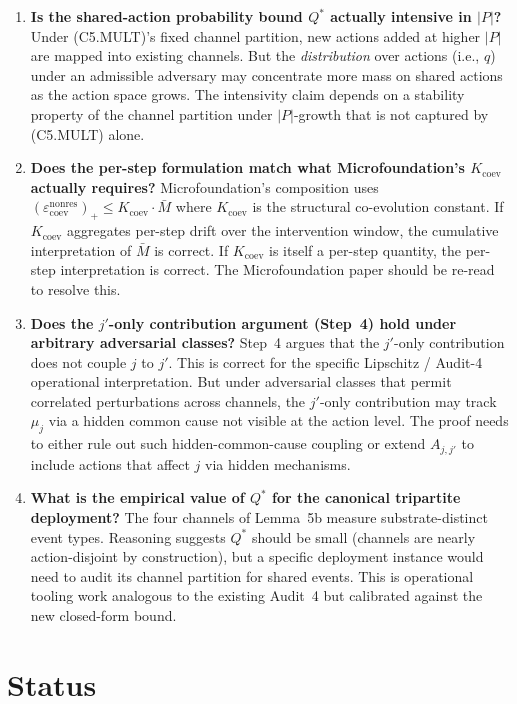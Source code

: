 \documentclass{article}
\newcommand{\epsnonresCoev}{\varepsilon_{\mathrm{coev}}^{\mathrm{nonres}}}
\begin{document}
\begin{enumerate}
\item \textbf{Is the shared-action probability bound $Q^*$ actually
intensive in $|P|$?}  Under (C5.MULT)'s fixed channel partition,
new actions added at higher $|P|$ are mapped into existing
channels.  But the \emph{distribution} over actions (i.e., $q$)
under an admissible adversary may concentrate more mass on shared
actions as the action space grows.  The intensivity claim depends
on a stability property of the channel partition under
$|P|$-growth that is not captured by (C5.MULT) alone.

\item \textbf{Does the per-step formulation match what
Microfoundation's $K_{\mathrm{coev}}$ actually requires?}
Microfoundation's composition uses
$(\epsnonresCoev)_+ \leq K_{\mathrm{coev}} \cdot \bar{M}$ where
$K_{\mathrm{coev}}$ is the structural co-evolution constant.  If
$K_{\mathrm{coev}}$ aggregates per-step drift over the
intervention window, the cumulative interpretation of $\bar{M}$ is
correct.  If $K_{\mathrm{coev}}$ is itself a per-step quantity,
the per-step interpretation is correct.  The Microfoundation paper
should be re-read to resolve this.

\item \textbf{Does the $j'$-only contribution argument
(Step~4) hold under arbitrary adversarial classes?}  Step~4
argues that the $j'$-only contribution does not couple $j$ to
$j'$.  This is correct for the specific Lipschitz / Audit-4
operational interpretation.  But under adversarial classes that
permit correlated perturbations across channels, the
$j'$-only contribution may track $\mu_j$ via a hidden common cause
not visible at the action level.  The proof needs to either rule
out such hidden-common-cause coupling or extend $A_{j, j'}$ to
include actions that affect $j$ via hidden mechanisms.

\item \textbf{What is the empirical value of $Q^*$ for the
canonical tripartite deployment?}  The four channels of Lemma~5b
measure substrate-distinct event types.  Reasoning suggests
$Q^*$ should be small (channels are nearly action-disjoint by
construction), but a specific deployment instance would need to
audit its channel partition for shared events.  This is
operational tooling work analogous to the existing Audit~4 but
calibrated against the new closed-form bound.
\end{enumerate}

\section{Status}
\end{document}
